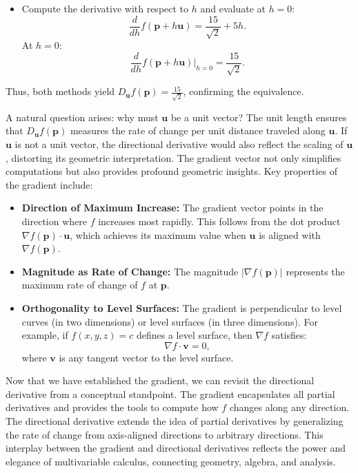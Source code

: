 \begin{example}
\begin{solution}
\begin{itemize}
    \item Compute the derivative with respect to \( h \) and evaluate at \( h = 0 \):
    \[
    \frac{d}{dh} f(\mathbf{p} + h\mathbf{u}) = \frac{15}{\sqrt{2}} + 5h.
    \]
    At \( h = 0 \):
    \[
    \frac{d}{dh} f(\mathbf{p} + h \mathbf{u}) \bigg|_{h=0} = \frac{15}{\sqrt{2}}.
    \]
\end{itemize}

Thus, both methods yield \( D_{\mathbf{u}} f(\mathbf{p}) = \frac{15}{\sqrt{2}} \), confirming the equivalence.
\end{solution}
\end{example}
\exampleline


\noindent A natural question arises: why must \( \mathbf{u} \) be a unit vector? The unit length ensures that \( D_{\mathbf{u}} f(\mathbf{p}) \) measures the rate of change per unit distance traveled along \( \mathbf{u} \). If \( \mathbf{u} \) is not a unit vector, the directional derivative would also reflect the scaling of \( \mathbf{u} \), distorting its geometric interpretation. The gradient vector not only simplifies computations but also provides profound geometric insights. Key properties of the gradient include:
\begin{itemize}
    \item \textbf{Direction of Maximum Increase:} The gradient vector points in the direction where \( f \) increases most rapidly. This follows from the dot product \( \nabla f(\mathbf{p}) \cdot \mathbf{u} \), which achieves its maximum value when \( \mathbf{u} \) is aligned with \( \nabla f(\mathbf{p}) \).
    \item \textbf{Magnitude as Rate of Change:} The magnitude \( |\nabla f(\mathbf{p})| \) represents the maximum rate of change of \( f \) at \( \mathbf{p} \).
    \item \textbf{Orthogonality to Level Surfaces:} The gradient is perpendicular to level curves (in two dimensions) or level surfaces (in three dimensions). For example, if \( f(x, y, z) = c \) defines a level surface, then \( \nabla f \) satisfies:
    \[
    \nabla f \cdot \mathbf{v} = 0,
    \]
    where \( \mathbf{v} \) is any tangent vector to the level surface.
\end{itemize}



\noindent Now that we have established the gradient, we can revisit the directional derivative from a conceptual standpoint. The gradient encapsulates all partial derivatives and provides the tools to compute how \( f \) changes along any direction. The directional derivative extends the idea of partial derivatives by generalizing the rate of change from axis-aligned directions to arbitrary directions. This interplay between the gradient and directional derivatives reflects the power and elegance of multivariable calculus, connecting geometry, algebra, and analysis. \\

